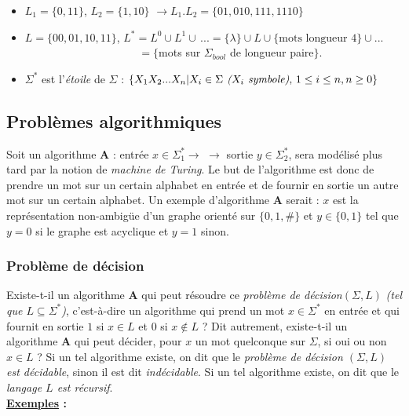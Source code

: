 \documentclass{article}
\newcommand{\titre}[1]{\textcolor{title}{#1}}
\newcommand{\tssect}[1]{\titre{\subsection{#1}}}
\newcommand{\tsssect}[1]{\titre{\subsubsection{#1}}}
\newcommand{\term}[1]{\textit{\textcolor{maintitle}{#1}}}
\begin{document}
\begin{sffamily}
\begin{itemize}
\item $L_1 = \{0,11\}$, $L_2 = \{1,10\}$ $\rightarrow L_1.L_2 = \{01,010,111,1110\}$
\item $L = \{00,01,10,11\}$, $L^* = L^0\cup L^1\cup\,...= \{\lambda\} \cup L \cup \{\text{mots longueur 4}\}\cup ...$\\
\indent $\qquad\qquad\qquad\qquad\,\,\qquad = \{$mots sur $\Sigma_{bool}$ de longueur paire$\}$.
\item $\Sigma^*$ est l'\term{étoile} de $\Sigma$ : $\{X_1X_2...X_n | X_i \in \Sigma \text{\textit{ ($X_i$ symbole)}},\, 
1 \leq i \leq n, n\geq 0\}$
\end{itemize}

\tssect{Problèmes algorithmiques}

Soit un algorithme \textbf{A} : entrée $x\in\Sigma_1^*\rightarrow$  $\rightarrow$ sortie 
$y\in\Sigma_2^*$, sera modélisé plus tard par la notion de \term{machine de Turing}. Le but de l'algorithme est donc de 
prendre un mot sur un certain alphabet en entrée et de fournir en sortie un autre mot sur un certain alphabet. Un 
exemple d'algorithme \textbf{A} serait : $x$ est la représentation non-ambigüe d'un graphe orienté sur $\{0,1,\#\}$ et 
$y \in \{0,1\}$ tel que $y = 0$ si le graphe est acyclique et $y=1$ sinon. \\

\tsssect{Problème de décision}

\noindent Existe-t-il un algorithme \textbf{A} qui peut résoudre ce \term{problème de décision}$(\Sigma,L)$ 
\textit{(tel que $L \subseteq \Sigma^*$)}, c'est-à-dire un algorithme qui prend un mot $x \in \Sigma^*$ en entrée et 
qui fournit en sortie $1$ si $x\in L$ et $0$ si $x \not\in L$ ? Dit autrement, existe-t-il un algorithme \textbf{A} qui 
peut décider, pour $x$ un mot quelconque sur $\Sigma$, si oui ou non $x\in L$ ? Si un tel algorithme existe, on dit que 
le \term{problème de décision $(\Sigma,L)$ est décidable}, sinon il est dit \term{indécidable}. Si un tel 
algorithme existe, on dit que le \term{langage $L$ est récursif}. \\

\noindent \textbf{\underline{Exemples} :} \\


\end{sffamily}
\end{document}
